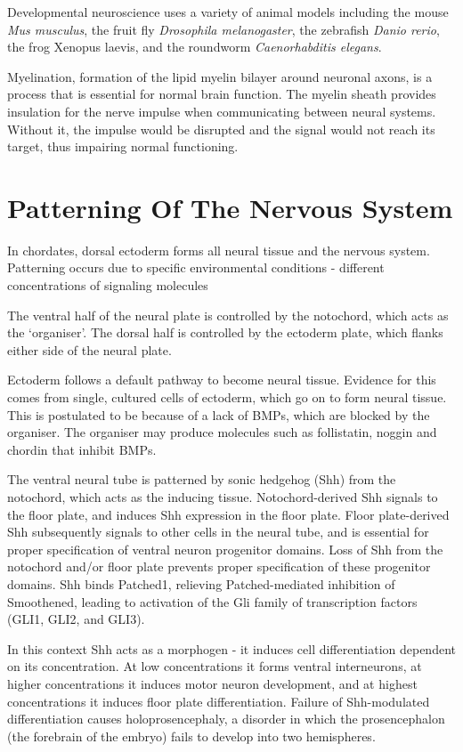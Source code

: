 Developmental neuroscience uses a variety of animal models including the mouse \emph{Mus musculus}, the fruit fly \emph{Drosophila melanogaster}, the zebrafish \emph{Danio rerio}, the frog Xenopus laevis, and the roundworm \emph{Caenorhabditis elegans}.

Myelination, formation of the lipid myelin bilayer around neuronal axons, is a process that is essential for normal brain function. The myelin sheath provides insulation for the nerve impulse when communicating between neural systems. Without it, the impulse would be disrupted and the signal would not reach its target, thus impairing normal functioning.

\hypertarget{patterning-of-the-nervous-system}{%
\section{Patterning Of The Nervous System}\label{patterning-of-the-nervous-system}}

In chordates, dorsal ectoderm forms all neural tissue and the nervous system. Patterning occurs due to specific environmental conditions - different concentrations of signaling molecules

The ventral half of the neural plate is controlled by the notochord, which acts as the `organiser'. The dorsal half is controlled by the ectoderm plate, which flanks either side of the neural plate.

Ectoderm follows a default pathway to become neural tissue. Evidence for this comes from single, cultured cells of ectoderm, which go on to form neural tissue. This is postulated to be because of a lack of BMPs, which are blocked by the organiser. The organiser may produce molecules such as follistatin, noggin and chordin that inhibit BMPs.

The ventral neural tube is patterned by sonic hedgehog (Shh) from the notochord, which acts as the inducing tissue. Notochord-derived Shh signals to the floor plate, and induces Shh expression in the floor plate. Floor plate-derived Shh subsequently signals to other cells in the neural tube, and is essential for proper specification of ventral neuron progenitor domains. Loss of Shh from the notochord and/or floor plate prevents proper specification of these progenitor domains. Shh binds Patched1, relieving Patched-mediated inhibition of Smoothened, leading to activation of the Gli family of transcription factors (GLI1, GLI2, and GLI3).

In this context Shh acts as a morphogen - it induces cell differentiation dependent on its concentration. At low concentrations it forms ventral interneurons, at higher concentrations it induces motor neuron development, and at highest concentrations it induces floor plate differentiation. Failure of Shh-modulated differentiation causes holoprosencephaly, a disorder in which the prosencephalon (the forebrain of the embryo) fails to develop into two hemispheres.

